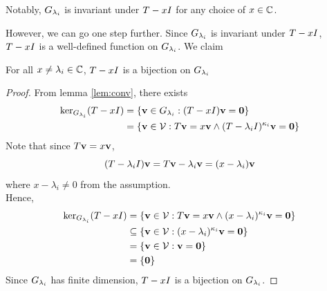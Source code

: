 \begin{corollary} \label{col:Gi_invariance}
    Notably, \(G_{\lambda_i}\) is invariant under \(T-xI\) for any choice of \(x\in\mathbb{C}\).
\end{corollary}

However, we can go one step further.
Since \(G_{\lambda_i}\) is invariant under \(T-xI\), \(T-xI\) is a well-defined function on \(G_{\lambda_i}\).
We claim
\begin{lemma} \label{lem:bijection}
    For all \(x\neq\lambda_i\in\mathbb{C}\), \(T-xI\) is a bijection on \(G_{\lambda_i}\)
\end{lemma}
\begin{proof}
    From lemma \ref{lem:conv}, there exists
    \begin{align*}
        \ker_{G_{\lambda_i}}(T-xI)
        &=\{\mathbf{v}\in G_{\lambda_i}:(T-xI)\mathbf{v}=\mathbf{0}\}\\
        &=\{\mathbf{v}\in\mathcal{V}:T\mathbf{v}=x\mathbf{v} \land (T-\lambda_iI)^{\kappa_i}\mathbf{v}=\mathbf{0}\}\\
    \end{align*}
    Note that since $T\mathbf{v}=x\mathbf{v}$,
    \begin{equation*}
        (T-\lambda_iI)\mathbf{v}=T\mathbf{v}-\lambda_i\mathbf{v}=(x-\lambda_i)\mathbf{v}
    \end{equation*}
    where \(x-\lambda_i\neq0\) from the assumption. \\
    Hence,
    \begin{align*}
        \ker_{G_{\lambda_i}}(T-xI)
        &=\{\mathbf{v}\in\mathcal{V}:T\mathbf{v}=x\mathbf{v} \land (x-\lambda_i)^{\kappa_i}\mathbf{v}=\mathbf{0}\}\\
        &\subseteq\{\mathbf{v}\in\mathcal{V}:(x-\lambda_i)^{\kappa_i}\mathbf{v}=\mathbf{0}\}\\
        &=\{\mathbf{v}\in\mathcal{V}:\mathbf{v}=\mathbf{0}\}\\
        &=\{\mathbf{0}\}\\
    \end{align*}
    Since \(G_{\lambda_i}\) has finite dimension, \(T-xI\) is a bijection on \(G_{\lambda_i}\).
\end{proof}


